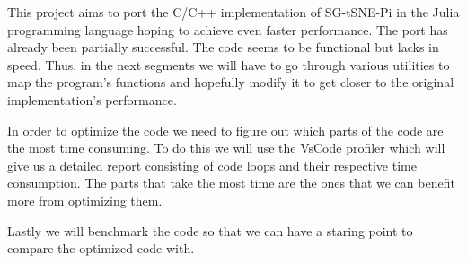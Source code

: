 This project aims to port the C/C++ implementation of SG-tSNE-Pi in the Julia programming language hoping 
to achieve even faster performance. The port has already been partially successful. The code seems to be 
functional but lacks in speed. Thus, in the next segments we will have to go through various utilities to 
map the program's functions and hopefully modify it to get closer to the original implementation's performance.

In order to optimize the code we need to figure out which parts of the code are the most time consuming.
To do this we will use the VsCode profiler which will give us a detailed report consisting of code loops
and their respective time consumption. The parts that take the most time are the ones that we can benefit 
more from optimizing them.

Lastly we will benchmark the code so that we can have a staring point to compare the optimized code with.
